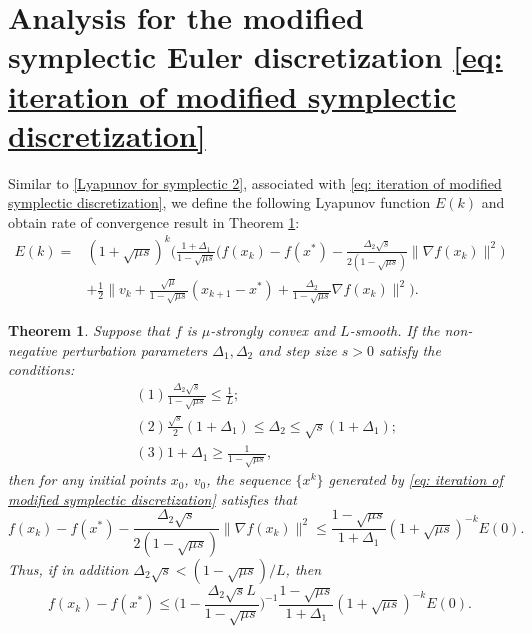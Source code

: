 \documentclass[11pt]{article}
\newcommand{\1}{\mathbf 1}
\numberwithin{equation}{section}
\newtheorem{THM}{Theorem}
\begin{document}
\section{Analysis for the modified symplectic Euler discretization \eqref{eq: iteration of modified symplectic discretization}} \label{sec:appdenx_modified}
Similar to \eqref{Lyapunov for symplectic 2}, associated with \eqref{eq: iteration of modified symplectic discretization}, we define the following Lyapunov function $E(k)$ and obtain rate of convergence result in Theorem \ref{th:modified symplectic 2 slow}:
\begin{equation}
	\label{Lyapunov for symplectic 2 slow}
	\begin{aligned}
		E(k)=&(1+\sqrt{\mu s})^k\big(\frac{1+\Delta_1}{1-\sqrt{\mu s}}\big(f(x_k)-f(x^*)-\frac{\Delta_2\sqrt{s}}{2(1-\sqrt{\mu s})}\|\nabla f(x_k)\|^2\big)\\
		&+\frac{1}{2}\|v_k+\frac{\sqrt{\mu}}{1-\sqrt{\mu s}}(x_{k+1}-x^*)+\frac{\Delta_2}{1-\sqrt{\mu s}}\nabla f(x_k)\|^2\big).
	\end{aligned}
\end{equation}
\begin{THM}
	\label{th:modified symplectic 2 slow}
	Suppose that $f$ is $\mu$-strongly convex and $L$-smooth. If the non-negative perturbation
	parameters $\Delta_1, \Delta_2$ and step size $s>0$ satisfy the conditions:
	\begin{equation}
		\label{conditions of modified symplectic 2 slow}
		\begin{aligned}
			&\, (1)\frac{\Delta_2\sqrt{s}}{1-\sqrt{\mu s}}\leqslant \frac{1}{L};\\
			&\, (2)\frac{\sqrt{s}}{2}(1+\Delta_1)\leqslant \Delta_2\leqslant \sqrt{s}(1+\Delta_1);\\
			&\, (3) 1+\Delta_1 \geqslant \frac{1}{1-\sqrt{\mu s}},
		\end{aligned}
	\end{equation}
	then for any initial points $x_0$, $v_0$, the sequence $\{x^k\}$ generated by \eqref{eq: iteration of modified symplectic discretization} satisfies that
	\begin{equation*}
		f(x_k)-f(x^*)-\frac{\Delta_2\sqrt{s}}{2(1-\sqrt{\mu s})}\|\nabla f(x_k)\|^2 \leqslant \frac{1-\sqrt{\mu s}}{1+\Delta_1}(1+\sqrt{\mu s})^{-k}E(0).
	\end{equation*}
	Thus, if in addition $\Delta_2\sqrt{s}<(1-\sqrt{\mu s})/L$, then
	\begin{equation}
		f(x_k)-f(x^*) \leqslant \Big(1-\frac{\Delta_2\sqrt{s}L}{1-\sqrt{\mu s}}\Big)^{-1}\frac{1-\sqrt{\mu s}}{1+\Delta_1}(1+\sqrt{\mu s})^{-k}E(0).
	\end{equation}
\end{THM}
\end{document}
